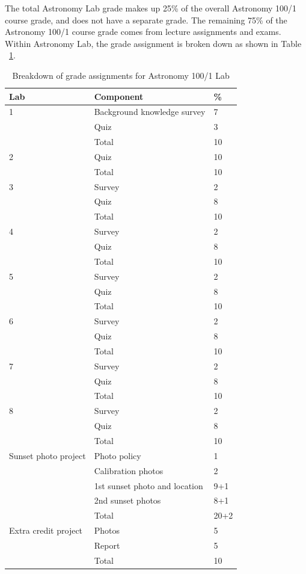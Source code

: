\documentclass[12pt]{article}
\begin{document}
The total Astronomy Lab grade makes up 25\% of the overall Astronomy 100/1 course grade, and does not have a separate grade. The remaining 75\% of the Astronomy 100/1 course grade comes from lecture assignments and exams. Within Astronomy Lab, the grade assignment is broken down as shown in Table ~\ref{tab:grades}.

\begin{table}[htbp]
\centering
\caption{Breakdown of grade assignments for Astronomy 100/1 Lab}
\begin{tabular}{|l|l|l|}\hline
Lab & Component & \% \\\hline
1 & Background knowledge survey & 7 \\ 
& Quiz & 3 \\\cline{2-3}
& Total & 10 \\\hline
2 & Quiz & 10 \\\cline{2-3}
& Total & 10 \\\hline
3 & Survey & 2 \\ 
& Quiz & 8 \\\cline{2-3}
& Total & 10 \\\hline
4 & Survey & 2 \\ 
& Quiz & 8 \\\cline{2-3}
& Total & 10 \\\hline
5 & Survey & 2 \\ 
& Quiz & 8 \\\cline{2-3}
& Total & 10 \\\hline
6 & Survey & 2 \\ 
& Quiz & 8 \\\cline{2-3}
& Total & 10 \\\hline
7 & Survey & 2 \\ 
& Quiz & 8 \\\cline{2-3}
& Total & 10 \\\hline
8 & Survey & 2 \\ 
& Quiz & 8 \\\cline{2-3}
& Total & 10 \\\hline
Sunset photo project & Photo policy & 1 \\ 
& Calibration photos & 2 \\
& 1st sunset photo and location & 9+1 \\
& 2nd sunset photos & 8+1 \\\cline{2-3}
& Total & 20+2 \\\hline
Extra credit project & Photos & 5 \\ 
& Report & 5 \\\cline{2-3}
& Total & 10 \\\hline
\end{tabular}
\label{tab:grades}
\end{table}
\end{document}

